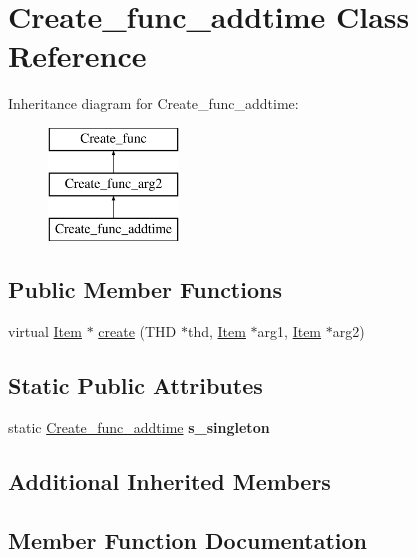 \hypertarget{classCreate__func__addtime}{}\section{Create\+\_\+func\+\_\+addtime Class Reference}
\label{classCreate__func__addtime}
Inheritance diagram for Create\+\_\+func\+\_\+addtime\+:\begin{figure}[H]
\begin{center}
\leavevmode
\includegraphics[height=3.000000cm]{classCreate__func__addtime}
\end{center}
\end{figure}
\subsection*{Public Member Functions}
\begin{DoxyCompactItemize}
\item 
virtual \mbox{\hyperlink{classItem}{Item}} $\ast$ \mbox{\hyperlink{classCreate__func__addtime_aa42159a31d1c799d27c6f8ddc7208f6c}{create}} (T\+HD $\ast$thd, \mbox{\hyperlink{classItem}{Item}} $\ast$arg1, \mbox{\hyperlink{classItem}{Item}} $\ast$arg2)
\end{DoxyCompactItemize}
\subsection*{Static Public Attributes}
\begin{DoxyCompactItemize}
\item 
\mbox{\label{classCreate__func__addtime_a2cccd89d73b8e617c7f249ac5b04e8c7}} 
static \mbox{\hyperlink{classCreate__func__addtime}{Create\+\_\+func\+\_\+addtime}} {\bfseries s\+\_\+singleton}
\end{DoxyCompactItemize}
\subsection*{Additional Inherited Members}


\subsection{Member Function Documentation}
\mbox{\label{classCreate__func__addtime_aa42159a31d1c799d27c6f8ddc7208f6c}} 
